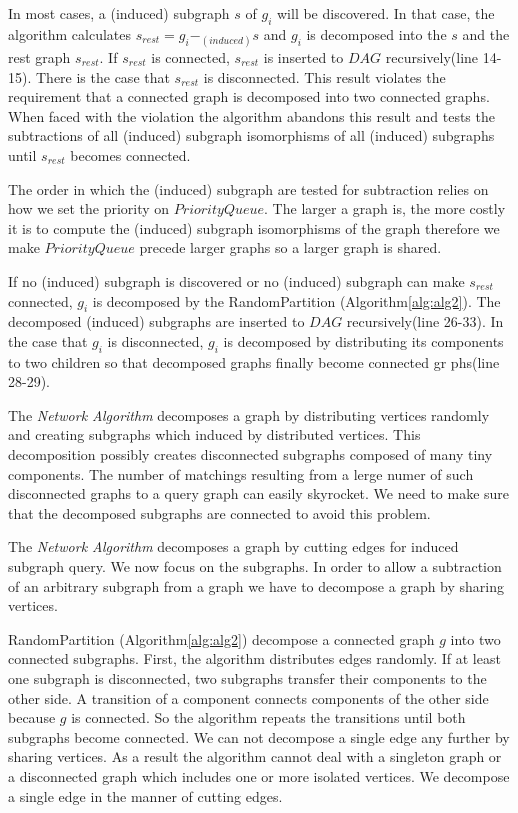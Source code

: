 In most cases, a (induced) subgraph $s$ of $g_i$ will be discovered. In that case, the algorithm calculates $s_{rest} = g_i -_{(induced)} s$ and $g_i$ is decomposed into the $s$ and the rest graph $s_{rest}$.
If $s_{rest}$ is connected, $s_{rest}$ is inserted to $DAG$ recursively(line 14-15).
There is the case that $s_{rest}$ is disconnected.
This result violates the requirement that a connected graph is decomposed into two connected graphs.
When faced with the violation the algorithm abandons this result and tests the subtractions of all (induced) subgraph isomorphisms of all (induced) subgraphs until $s_{rest}$ becomes connected.

The order in which the  (induced) subgraph are tested for subtraction relies on how we set the priority on $PriorityQueue$.
The larger a graph is, the more costly it is to compute the (induced) subgraph isomorphisms of the graph therefore we make $PriorityQueue$ precede larger graphs
so a larger graph is shared.

If no (induced) subgraph is discovered or no (induced) subgraph can make $s_{rest}$ connected, $g_i$ is decomposed by the RandomPartition (Algorithm\ref{alg:alg2}).
The decomposed (induced) subgraphs are inserted to $DAG$ recursively(line 26-33).
In the case that $g_i$ is disconnected, $g_i$ is decomposed by distributing its components to two children so that decomposed graphs finally become connected gr
phs(line 28-29).



The \textit{Network Algorithm} decomposes a graph by distributing vertices randomly and creating subgraphs which induced by distributed vertices.
This decomposition possibly creates disconnected subgraphs composed of many tiny components.
The number of matchings resulting from a lerge numer of such disconnected graphs to a query graph can easily skyrocket.
We need to make sure that the decomposed subgraphs are connected to avoid this problem.

The \textit{Network Algorithm} decomposes a graph by cutting edges for induced subgraph query.
We  now  focus on the subgraphs.
In order to allow a subtraction of an arbitrary subgraph from a graph we have to decompose a graph by sharing vertices.

RandomPartition (Algorithm\ref{alg:alg2}) decompose a connected graph $g$ into two connected subgraphs.
First, the algorithm distributes edges randomly.
If at least one subgraph is disconnected, two subgraphs transfer their components to the other side.
A transition of a component connects components of the other side because $g$ is connected.
So the algorithm repeats the transitions until both subgraphs become connected.
We can not decompose a single edge any further by sharing vertices.
As a result the algorithm cannot deal with a singleton graph or a disconnected graph which includes one or more isolated vertices.
We decompose a single edge in the manner of cutting edges.

